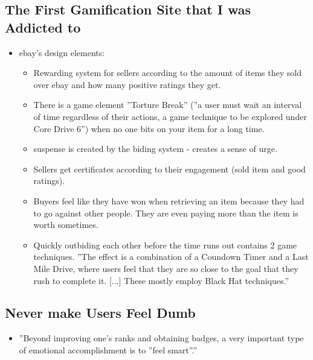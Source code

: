 \subsection{The First Gamification Site that I was Addicted to}
\begin{itemize}
    \item ebay's design elements:
    \begin{itemize}
        \item Rewarding system for sellers according to the amount of items they sold over ebay and how many positive ratings they get.
        \item There is a game element ''Torture Break'' (''a user must wait an interval of time regardless of their actions, a game technique to be explored under Core Drive 6'') when no one bits on your item for a long time.
        \item suspense is created by the biding system - creates a sense of urge.
        \item Sellers get certificates according to their engagement (sold item and good ratings).
        \item Buyers feel like they have won when retrieving an item because they had to go against other people. They are even paying more than the item is worth sometimes.
        \item Quickly outbiding each other before the time runs out contains 2 game techniques. ''The effect is a combination of a Coundown Timer and a Last Mile Drive, where users feel that they are so close to the goal that they rush to complete it. [...] These mostly employ Black Hat techniques.''
    \end{itemize}
\end{itemize}

\subsection{Never make Users Feel Dumb}
\begin{itemize}
    \item ''Beyond improving one's ranks and obtaining badges, a very important type of emotional accomplishment is to ''feel smart''.''
\end{itemize}

